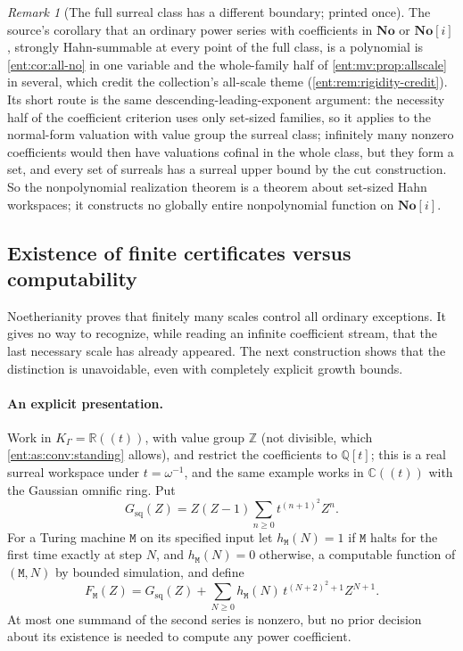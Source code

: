 \documentclass[11pt]{article}
\theoremstyle{plain}
\theoremstyle{plain}
\theoremstyle{plain}
\theoremstyle{definition}
\theoremstyle{definition}
\theoremstyle{definition}
\theoremstyle{definition}
\theoremstyle{remark}
\newtheorem{remark}[remark]{Remark}
\newcommand{\C}{\mathbb C}\newcommand{\R}{\mathbb R}
\newcommand{\Q}{\mathbb Q}\newcommand{\Z}{\mathbb Z}\newcommand{\N}{\mathbb N}
\newcommand{\No}{\mathbf{No}}
\newcommand{\K}{K_\Gamma}\newcommand{\KD}{K_\Delta}
\begin{document}
\begin{remark}[The full surreal class has a different boundary; printed once]
\label{ent:as:rem:full-class}
The source's corollary that an ordinary power series with coefficients in
$\No$ or $\No[i]$, strongly Hahn-summable at every point of the full class, is
a polynomial is \cref{ent:cor:all-no} in one variable and the whole-family half
of \cref{ent:mv:prop:allscale} in several, which credit the collection's
all-scale theme (\cref{ent:rem:rigidity-credit}). Its short route is the same
descending-leading-exponent argument: the necessity half of the coefficient
criterion uses only set-sized families, so it applies to the normal-form
valuation with value group the surreal class; infinitely many nonzero
coefficients would then have valuations cofinal in the whole class, but they
form a set, and every set of surreals has a surreal upper bound by the cut
construction. So the nonpolynomial realization theorem is a theorem about
set-sized Hahn workspaces; it constructs no globally entire nonpolynomial
function on $\No[i]$.
\end{remark}

\subsection{Existence of finite certificates versus computability}
\label{ent:as:subsec:computability}

Noetherianity proves that finitely many scales control all ordinary
exceptions. It gives no way to recognize, while reading an infinite
coefficient stream, that the last necessary scale has already appeared. The
next construction shows that the distinction is unavoidable, even with
completely explicit growth bounds.

\paragraph{An explicit presentation.} Work in $\K=\R((t))$, with value group
$\Z$ (not divisible, which \cref{ent:as:conv:standing} allows), and restrict
the coefficients to $\Q[t]$; this is a real surreal workspace under
$t=\omega^{-1}$, and the same example works in $\C((t))$ with the Gaussian
omnific ring. Put
\begin{equation}\label{ent:as:eq:base-machine}
 G_{\mathrm{sq}}(Z)=Z(Z-1)\sum_{n\ge0}t^{(n+1)^2}Z^n .
\end{equation}
For a Turing machine $\mathtt M$ on its specified input let
$h_{\mathtt M}(N)=1$ if $\mathtt M$ halts for the first time exactly at step
$N$, and $h_{\mathtt M}(N)=0$ otherwise, a computable function of
$(\mathtt M,N)$ by bounded simulation, and define
\begin{equation}\label{ent:as:eq:machine-family}
 F_{\mathtt M}(Z)=G_{\mathrm{sq}}(Z)
 +\sum_{N\ge0}h_{\mathtt M}(N)\,t^{(N+2)^2+1}Z^{N+1}.
\end{equation}
At most one summand of the second series is nonzero, but no prior decision
about its existence is needed to compute any power coefficient.
\end{document}
